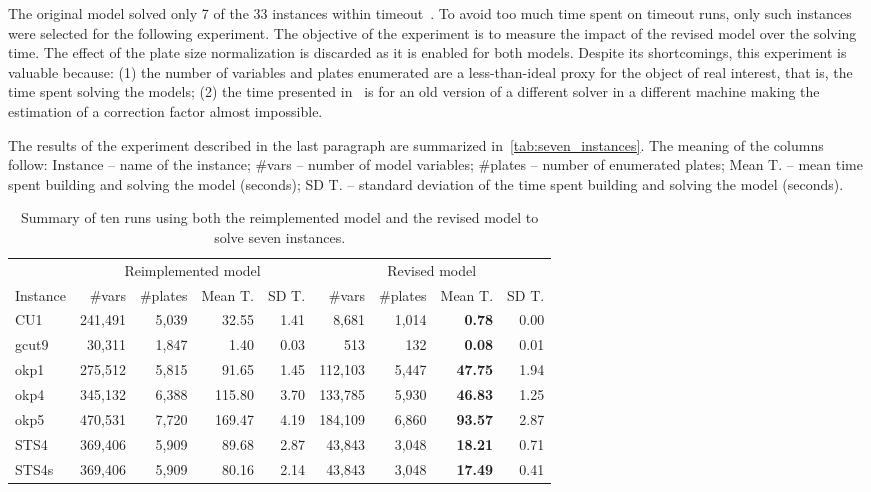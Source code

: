 \documentclass[smallextended]{svjour3}       %
\begin{document}
The original model solved only 7 of the 33 instances within timeout~\cite{furini:2,016}.
To avoid too much time spent on timeout runs, only such instances were selected for the following experiment.
The objective of the experiment is to measure the impact of the revised model over the solving time.
The effect of the plate size normalization is discarded as it is enabled for both models.
Despite its shortcomings, this experiment is valuable because: (1) the number of variables and plates enumerated are a less-than-ideal proxy for the object of real interest, that is, the time spent solving the models; (2) the time presented in~\cite{furini:2,016} is for an old version of a different solver in a different machine making the estimation of a correction factor almost impossible.

The results of the experiment described in the last paragraph are summarized in~\autoref{tab:seven_instances}.
The meaning of the columns follow:
Instance -- name of the instance; \#vars -- number of model variables; \#plates -- number of enumerated plates; Mean T. -- mean time spent building and solving the model (seconds); SD T. -- standard deviation of the time spent building and solving the model (seconds).

\begin{table}
\caption{Summary of ten runs using both the reimplemented model and the revised model to solve seven instances.}
\setlength\tabcolsep{2.5px}
\def\arraystretch{1.1}
\begin{tabular}{@{\extracolsep{4pt}}lrrrrrrrr@{}}
& \multicolumn{4}{c}{Reimplemented model} & \multicolumn{4}{c}{Revised model}\\
\cline{2-5}\cline{6-9}
Instance & \#vars & \#plates & Mean T. & SD T. & \#vars & \#plates & Mean T. & SD T.\\
\hline
CU1 & 241,491 & 5,039 & 32.55 & 1.41 & 8,681 & 1,014 & \bf{0.78} & 0.00 \\
gcut9 & 30,311 & 1,847 & 1.40 & 0.03 & 513 & 132 & \bf{0.08} & 0.01 \\
okp1 & 275,512 & 5,815 & 91.65 & 1.45 & 112,103 & 5,447 & \bf{47.75} & 1.94 \\
okp4 & 345,132 & 6,388 & 115.80 & 3.70 & 133,785 & 5,930 & \bf{46.83} & 1.25 \\
okp5 & 470,531 & 7,720 & 169.47 & 4.19 & 184,109 & 6,860 & \bf{93.57} & 2.87 \\
STS4 & 369,406 & 5,909 & 89.68 & 2.87 & 43,843 & 3,048 & \bf{18.21} & 0.71 \\
STS4s & 369,406 & 5,909 & 80.16 & 2.14 & 43,843 & 3,048 & \bf{17.49} & 0.41 \\
\hline
\end{tabular}
\label{tab:seven_instances}
\end{table}
\end{document}
